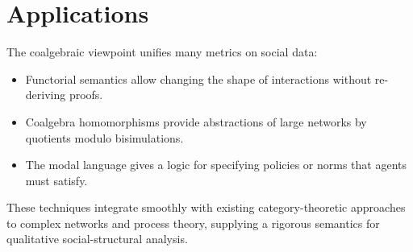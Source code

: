 \documentclass[12pt]{article}
\begin{document}
\section*{Applications}
The coalgebraic viewpoint unifies many metrics on social data:
\begin{itemize}
  \item Functorial semantics allow changing the shape of interactions without re-deriving proofs.
  \item Coalgebra homomorphisms provide abstractions of large networks by quotients modulo bisimulations.
  \item The modal language gives a logic for specifying policies or norms that agents must satisfy.
\end{itemize}
These techniques integrate smoothly with existing category-theoretic approaches to complex networks and process theory, supplying a rigorous semantics for qualitative social-structural analysis.
\end{document}
